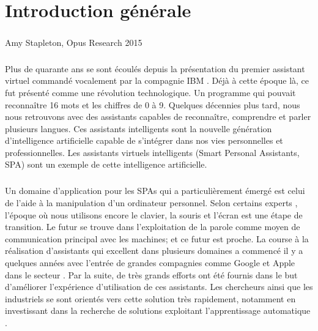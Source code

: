 \chapter*{Introduction générale}
\paragraph{}
\begin{chapquote}{Amy Stapleton, Opus Research 2015}
\end{chapquote}

\paragraph{}
Plus de quarante ans se sont écoulés depuis la présentation du premier assistant virtuel commandé vocalement par la compagnie IBM \citep{ibm_spa}. Déjà à cette époque là, ce fut présenté comme une révolution technologique. Un programme qui pouvait reconnaître 16 mots et les chiffres de 0 à 9. Quelques décennies plus tard, nous nous retrouvons avec des assistants capables de reconnaître, comprendre et parler plusieurs langues. Ces assistants intelligents sont la nouvelle génération d'intelligence artificielle capable de s'intégrer dans nos vies personnelles et professionnelles. Les assistants virtuels intelligents (Smart Personal Assistants, SPA) sont un exemple de cette	 intelligence artificielle. 

\paragraph{}
Un domaine d'application pour les SPAs qui a particulièrement émergé est celui de l'aide à la manipulation d'un ordinateur personnel. Selon certains experts \citep{spa_arch,virtualbutler,SPA-overview}, l'époque où nous utilisons encore le clavier, la souris et l'écran est une étape de transition. Le futur se trouve dans l'exploitation de la parole comme moyen de communication principal avec les machines; et ce futur est proche. La course à la réalisation d'assistants qui excellent dans plusieurs domaines a commencé il y a quelques années avec l'entrée de grandes compagnies comme Google et Apple dans le secteur \citep{spas_survey}. Par la suite, de très grands efforts ont été fournis dans le but d'améliorer l'expérience d'utilisation de ces assistants. Les chercheurs ainsi que les industriels se sont orientés vers cette solution très rapidement, notamment en investissant dans la recherche de solutions exploitant l'apprentissage automatique \citep{spas_survey}.

